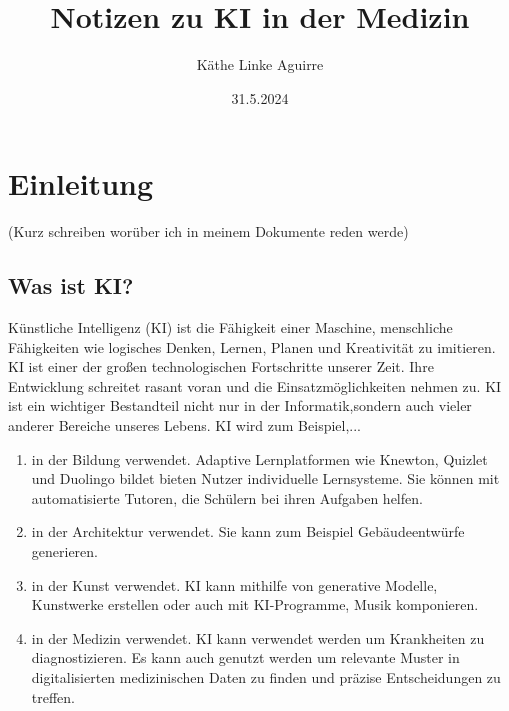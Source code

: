 \documentclass{article}
\title{Notizen zu KI in der Medizin}
\author{Käthe Linke Aguirre}
\date{31.5.2024}
\begin{document}
\maketitle


    \tableofcontents

\newpage


\section {Einleitung}

(Kurz schreiben worüber ich in meinem Dokumente reden werde)

\subsection{Was ist KI?}
  
Künstliche Intelligenz (KI) ist die Fähigkeit einer Maschine, menschliche Fähigkeiten
wie logisches Denken, Lernen, Planen und Kreativität zu imitieren. KI ist einer der 
großen technologischen Fortschritte unserer Zeit. Ihre Entwicklung schreitet 
rasant voran und die Einsatzmöglichkeiten nehmen zu. KI ist ein wichtiger Bestandteil nicht nur in der 
Informatik,sondern auch vieler anderer Bereiche unseres Lebens. 
\newline
KI wird zum Beispiel,... 
\begin{enumerate}
    \item in der Bildung verwendet. Adaptive Lernplatformen wie Knewton, Quizlet und Duolingo bildet 
    bieten Nutzer individuelle Lernsysteme. Sie können mit automatisierte Tutoren, die Schülern bei 
    ihren Aufgaben helfen.
    \item in der Architektur verwendet. Sie kann zum Beispiel Gebäudeentwürfe generieren.
    \item in der Kunst verwendet. KI kann mithilfe von generative Modelle, Kunstwerke erstellen oder 
    auch mit KI-Programme, Musik komponieren.
    \item in der Medizin verwendet. KI kann verwendet werden um Krankheiten zu diagnostizieren. Es kann auch genutzt werden um relevante Muster in digitalisierten medizinischen 
    Daten zu finden und präzise Entscheidungen zu treffen.
\end{enumerate}
\end{document}
